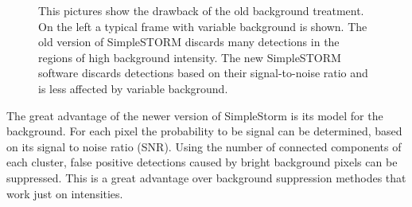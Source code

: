 \begin{figure}
\hfill
{}\hfill	
{}

\caption{This pictures show the drawback of the old background treatment. On the left a typical frame with variable background is shown. The old version of SimpleSTORM discards many detections in the regions of high background intensity. The new SimpleSTORM software discards detections based on their signal-to-noise ratio and is less affected by variable background.}
\label{postproc}	

\end{figure}

The great advantage of the newer version of SimpleStorm is its model for the background. For each pixel the probability to be signal can be determined, based on its signal to noise ratio (SNR). Using the number of connected components of each cluster, false positive detections caused by bright background pixels can be suppressed. This is a great advantage over background suppression methodes that work just on intensities.

